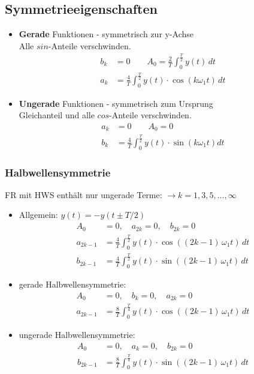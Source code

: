 \subsection{Symmetrieeigenschaften}
\begin{itemize}
	\item \textbf{Gerade} Funktionen
	      - symmetrisch zur y-Achse\\
	     {\small Alle $sin$-Anteile verschwinden.}
	     \begin{align*}
	     	b_k &=0 \qquad
	     	A_0 = \frac{2}{T}\int^{\frac{T}{2}}_{0} y(t)\,dt\\
	     	a_{k} &= \frac{4}{T}\int^{\frac{T}{2}}_{0}y(t)\cdot \cos(k\omega_1t)\,dt
	     \end{align*}
	\item \textbf{Ungerade} Funktionen
	      - symmetrisch zum Ursprung\\
	  		{\small Gleichanteil und alle $cos$-Anteile verschwinden.}
	      \begin{align*}
	      	a_k &=0 \qquad
	      	A_0 = 0\\
	      	b_{k} &= \frac{4}{T}\int^{\frac{T}{2}}_{0}y(t)\cdot \sin(k\omega_1t) dt
	      \end{align*}
\end{itemize}
\subsubsection{Halbwellensymmetrie}
{\small FR mit HWS enthält nur ungerade Terme: $\rightarrow k=1,3,5,\dots,\infty$}
\begin{itemize}
	
	\item Allgemein: $y(t) = -y(t \pm T/2)$
	\begin{align*}
		A_0 &= 0,\quad
		a_{2k} = 0,\quad
		b_{2k} = 0\\
		a_{2k-1} &= \frac{4}{T}\int^{\frac{T}{2}}_{0}y(t)\cdot \cos((2k-1)\,\omega_1t)\,dt\\
		b_{2k-1} &= \frac{4}{T}\int^{\frac{T}{2}}_{0}y(t)\cdot \sin((2k-1)\,\omega_1t)\,dt
	\end{align*}
	
	\item gerade Halbwellensymmetrie:
		\begin{align*}
		A_0 &= 0,\quad
		b_k = 0,\quad
		a_{2k} = 0\\
		a_{2k-1} &= \frac{8}{T}\int^{\frac{T}{4}}_{0}y(t)\cdot \cos((2k-1)\,\omega_1t)\,dt
	\end{align*}
	
		\item ungerade Halbwellensymmetrie:
	\begin{align*}
	A_0 &= 0,\quad
	a_k = 0,\quad
	b_{2k} = 0\\
	b_{2k-1} &= \frac{8}{T}\int^{\frac{T}{4}}_{0}y(t)\cdot \sin((2k-1)\,\omega_1t)\,dt
	\end{align*}
\end{itemize}

